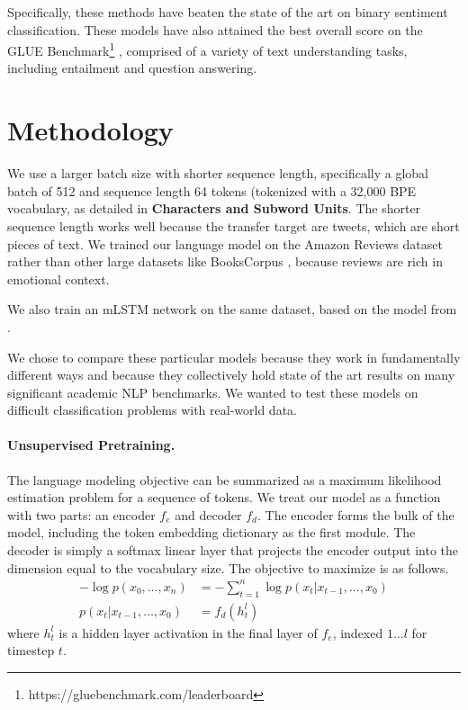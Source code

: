 \documentclass[letterpaper]{article} %
\begin{document}
Specifically, these methods have beaten the state of the art on binary sentiment classification. These models have also attained the best overall score on the GLUE Benchmark\footnote{https://gluebenchmark.com/leaderboard} \protect\cite{GLUE2018}, comprised of a variety of text understanding tasks, including entailment and question answering.


\section{Methodology}
We use a larger batch size with shorter sequence length, specifically a global batch of 512 and sequence length 64 tokens (tokenized with a 32,000 BPE vocabulary, as detailed in \textbf{Characters and Subword Units}. The shorter sequence length works well because the transfer target are tweets, which are short pieces of text.  We trained our language model on the Amazon Reviews dataset \protect\cite{McAuley2015} rather than other large datasets like BooksCorpus \protect\cite{BooksCorpus2015}, because reviews are rich in emotional context. 

We also train an mLSTM network on the same dataset, based on the model from \protect\cite{Puri2018}. 

We chose to compare these particular models because they work in fundamentally different ways and because they collectively hold state of the art results on many significant academic NLP benchmarks. We wanted to test these models on difficult classification problems with real-world data. 


\paragraph{Unsupervised Pretraining.} 
The language modeling objective can be summarized as a maximum likelihood estimation problem for a sequence of tokens. We treat our model as a function with two parts: an encoder $f_e$ and decoder $f_d$. The encoder forms the bulk of the model, including the token embedding dictionary as the first module. The decoder is simply a softmax linear layer that projects the encoder output into the dimension equal to the vocabulary size. The objective to maximize is as follows. 
\begin{align*}
-\log{p(x_0,\ldots, x_n)} &= -\sum_{t=1}^n \log{p(x_t | x_{t-1}, \ldots, x_0)} \\
p(x_t | x_{t-1}, \ldots, x_0) &= f_d(h^l_t)
\end{align*}
where $h^l_t$ is a hidden layer activation in the final layer of $f_e$, indexed $1 \ldots l$ for timestep $t$. 
\end{document}
